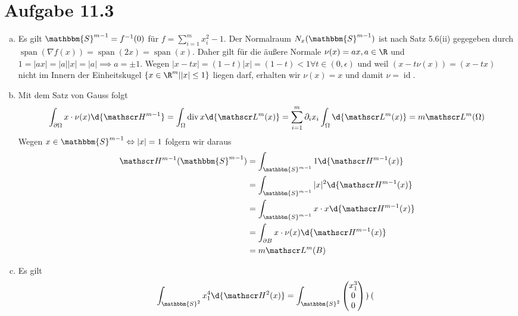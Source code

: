 \documentclass{article}
\begin{document}
\section*{Aufgabe 11.3}
    \begin{enumerate}[(a)]
        \item Es gilt $\mathbbm{S}^{m-1} = f^{-1}(0)$ für $f = \sum_{i = 1}^{m} x_i^2 - 1$.
        Der Normalraum $N_x(\mathbbm{S}^{m-1})$ ist nach Satz 5.6(ii)
        gegegeben durch $\operatorname{span}(\nabla f(x)) = \operatorname{span}(2x) = \operatorname{span}(x)$.
        Daher gilt für die äußere Normale $\nu(x) = ax, a\in \R$ und $1 = |ax| = |a| |x| = |a| \implies a = \pm 1$.
        Wegen $|x - tx| = (1-t)|x| = (1-t) < 1 \forall t \in (0,\epsilon)$ und weil $(x - t\nu(x)) = (x - tx)$ nicht im Innern
        der Einheitskugel $\{x \in \R^m| |x| \leq 1\}$ liegen darf, erhalten wir $\nu(x) = x$ und damit $\nu = \operatorname{id}$.
        \item Mit dem Satz von Gauss folgt
        \begin{align*}
            \int_{\partial \Omega} x \cdot \nu(x) \d{\mathscr H^{m-1}} = \int_\Omega \operatorname{div} x \d{\mathscr L^m(x)} 
            = \sum_{i = 1}^{m} \partial_i x_i \int_\Omega \d{\mathscr L^m(x)} = m \mathscr L^m(\Omega)
        \end{align*}
        Wegen $x \in \mathbbm{S}^{m-1} \Leftrightarrow |x| = 1$ folgern wir daraus
        \begin{align*}
            \mathscr H^{m-1}(\mathbbm{S}^{m-1}) &= \int_{\mathbbm{S}^{m-1}} 1 \d{\mathscr H^{m-1}(x)}\\
            &= \int_{\mathbbm{S}^{m-1}} |x|^2 \d{\mathscr H^{m-1}(x)}\\
            &= \int_{\mathbbm{S}^{m-1}} x \cdot x \d{\mathscr H^{m-1}(x)}\\
            &= \int_{\partial B} x \cdot \nu(x) \d{\mathscr H^{m-1}(x)}\\
            &= m\mathscr L^m(B)
        \end{align*}
        \item Es gilt
        \begin{align*}
            \int_{\mathbbm{S}^2} x_1^4 \d{\mathscr H^2(x)} &= \int_{\mathbbm{S}^2} \begin{pmatrix}
                x_1^3\\0\\0
            \end{pmatrix} \cdot \begin{pmatrix}

\end{pmatrix}
\end{align*}
\end{enumerate}
\end{document}
